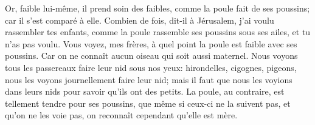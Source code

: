 Or, faible lui-même, il prend soin des faibles,
	comme la poule fait de ses poussins;
	car il s’est comparé à elle.
Combien de fois, dit-il à Jérusalem, j’ai voulu rassembler tes enfants,
	comme la poule rassemble ses poussins sous ses ailes, et tu n’as pas voulu.
Vous voyez, mes frères, à quel point la poule est faible avec ses poussins.
	Car on ne connaît aucun oiseau qui soit aussi maternel.
Nous voyons tous les passereaux faire leur nid sous nos yeux:
	hirondelles, cigognes, pigeons,
		nous les voyons journellement faire leur nid;
	mais il faut que nous les voyions dans leurs nids
		pour savoir qu’ils ont des petits.
La poule, au contraire, est tellement tendre pour ses poussins,
	que même si ceux-ci ne la suivent pas, et qu’on ne les voie pas,
	on reconnaît cependant qu’elle est mère.
